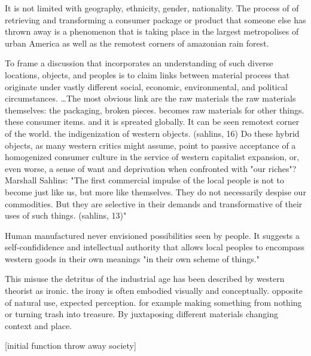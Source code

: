  It is not limited with geography, ethnicity, gender, nationality. The process of of retrieving and transforming a consumer package or product that someone else has thrown away is a phenomenon that is taking place in the largest metropolises of urban America as well as the remotest corners of amazonian rain forest. 

 To frame a discussion that incorporates an understanding of such diverse locations, objects, and peoples is to claim links between material process that originate under vastly different social, economic, environmental, and political circumstances. \ldots The most obvious link are the raw materials the raw materials themselves: the packaging, broken pieces. becomes raw materials for other things. these consumer items. and it is spreated globally. It can be seen remotest corner of the world. the indigenization of western objects. (sahlins, 16) Do these hybrid objects, as many western critics might assume, point to passive acceptance of a homogenized consumer culture in the service of western capitalist expansion, or, even worse, a sense of want and deprivation when confronted with "our riches"? Marshall Sahlins: "The first commercial impulse of the local people is not to become just like us, but more like themselves. They do not necessarily despise our commodities. But they are selective in their demands and transformative of their uses of such things. (sahlins, 13)" 

 Human manufactured never envisioned possibilities seen by people. It suggests a self-confididence and intellectual authority that allows local peoples to encompass western goods in their own meanings "in their own scheme of things." 

 This misuse the detritus of the industrial age has been described by western theorist as ironic. the irony is often embodied visually and conceptually. opposite of natural use, expected perception. for example making something from nothing or turning trash into treasure. By juxtaposing different materials changing context and place. 


[initial function throw away society] 

